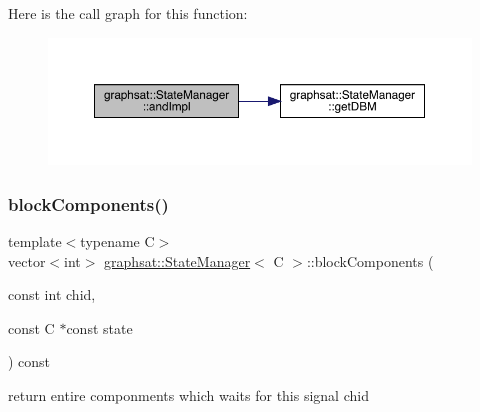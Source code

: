 Here is the call graph for this function\+:
\nopagebreak
\begin{figure}[H]
\begin{center}
\leavevmode
\includegraphics[width=350pt]{classgraphsat_1_1_state_manager_a2a4f0e95d8c6b0d3692b239bf4b64538_cgraph}
\end{center}
\end{figure}
\mbox{\label{classgraphsat_1_1_state_manager_a85a8c7421acbc58c92512eca3c4af0e3}} 
\subsubsection{\texorpdfstring{blockComponents()}{blockComponents()}}
{\footnotesize\ttfamily template$<$typename C$>$ \\
vector$<$int$>$ \mbox{\hyperlink{classgraphsat_1_1_state_manager}{graphsat\+::\+State\+Manager}}$<$ C $>$\+::block\+Components (\begin{DoxyParamCaption}\item[{const int}]{chid,  }\item[{const C $\ast$const}]{state }\end{DoxyParamCaption}) const\hspace{0.3cm}{\ttfamily [inline]}}

return entire componments which waits for this signal chid\mbox{\label{classgraphsat_1_1_state_manager_a1940edced635df5cc3bd8bd023a87478}} 
